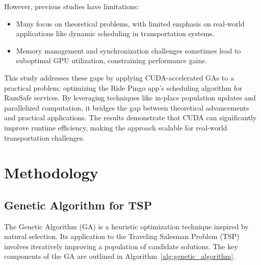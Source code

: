 \documentclass[conference]{IEEEtran}
\begin{document}
However, previous studies have limitations:
    \begin{itemize}
        \item Many focus on theoretical problems, with limited emphasis on real-world applications like dynamic scheduling in transportation systems.
        \item Memory management and synchronization challenges sometimes lead to suboptimal GPU utilization, constraining performance gains.
    \end{itemize}


This study addresses these gaps by applying CUDA-accelerated GAs to a practical problem: optimizing the Ride Pingo app’s scheduling algorithm for RamSafe services. By leveraging techniques like in-place population updates and parallelized computation, it bridges the gap between theoretical advancements and practical applications. The results demonstrate that CUDA can significantly improve runtime efficiency, making the approach scalable for real-world transportation challenges.


\section{Methodology}
\subsection{Genetic Algorithm for TSP}

The Genetic Algorithm (GA) is a heuristic optimization technique inspired by natural selection. Its application to the Traveling Salesman Problem (TSP) involves iteratively improving a population of candidate solutions. The key components of the GA are outlined in Algorithm~\ref{alg:genetic_algorithm}.\\
\end{document}

